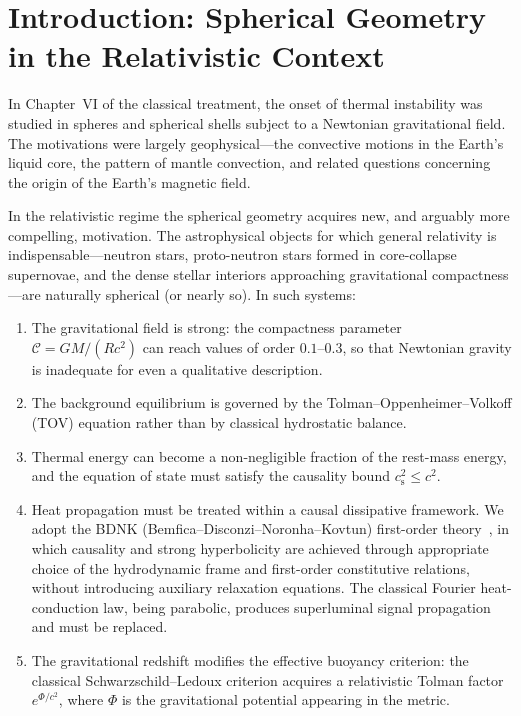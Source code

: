 
\section{Introduction: Spherical Geometry in the Relativistic Context}
\label{sec:rel-55}

In Chapter~VI of the classical treatment, the onset of thermal instability
was studied in spheres and spherical shells subject to a Newtonian
gravitational field.  The motivations were largely geophysical---the
convective motions in the Earth's liquid core, the pattern of mantle
convection, and related questions concerning the origin of the Earth's
magnetic field.

In the relativistic regime the spherical geometry acquires new, and arguably
more compelling, motivation.  The astrophysical objects for which general
relativity is indispensable---neutron stars, proto-neutron stars formed in
core-collapse supernovae, and the dense stellar interiors approaching
gravitational compactness---are naturally spherical (or nearly so).  In
such systems:
\begin{enumerate}
\item[(i)] The gravitational field is strong: the compactness parameter
  $\mathcal{C} = GM/(Rc^{2})$ can reach values of order $0.1$--$0.3$,
  so that Newtonian gravity is inadequate for even a qualitative
  description.
\item[(ii)] The background equilibrium is governed by the
  Tolman--Oppenheimer--Volkoff (TOV) equation rather than by classical
  hydrostatic balance.
\item[(iii)] Thermal energy can become a non-negligible fraction of the
  rest-mass energy, and the equation of state must satisfy the causality
  bound $c_{\mathrm{s}}^{2} \le c^{2}$.
\item[(iv)] Heat propagation must be treated within a causal dissipative
  framework.  We adopt the BDNK (Bemfica--Disconzi--Noronha--Kovtun)
  first-order theory~\cite{BemficaDN2018,Kovtun2019,BemficaDN2019}, in which
  causality and strong hyperbolicity are achieved through appropriate
  choice of the hydrodynamic frame and first-order constitutive relations,
  without introducing auxiliary relaxation equations.  The classical
  Fourier heat-conduction law, being parabolic, produces superluminal
  signal propagation and must be replaced.
\item[(v)] The gravitational redshift modifies the effective buoyancy
  criterion: the classical Schwarzschild--Ledoux criterion acquires a
  relativistic Tolman factor $e^{\Phi/c^{2}}$, where $\Phi$ is the
  gravitational potential appearing in the metric.
\end{enumerate}


